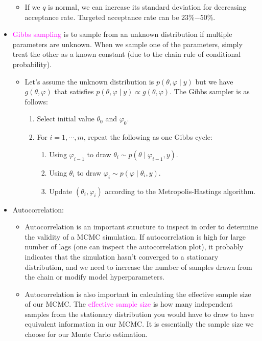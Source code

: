\documentclass[UTF8]{book}
\newcommand{\concept}[1]{\textcolor{magenta}{#1}}
\begin{document}
\begin{itemize}
\begin{itemize}
\begin{itemize}
	\end{itemize}
	\item If we $q$ is normal, we can increase its standard deviation for decreasing acceptance rate. Targeted acceptance rate can be 23\%$-50\%$.
\end{itemize}
\item \concept{Gibbs sampling} is to sample from an unknown distribution if multiple parameters are unknown. When we sample one of the parameters, simply treat the other as a known constant (due to the chain rule of conditional probability).
\begin{itemize}
	\item Let's assume the unknown distribution is $p(\theta,\varphi\mid y)$ but we have $g(\theta,\varphi)$ that satisfies $p(\theta,\varphi\mid y)\propto g(\theta,\varphi)$. The Gibbs sampler is as follows:
\begin{enumerate}
	\item Select initial value $\theta_0$ and $\varphi_0$.
	\item For $i=1,\cdots,m$, repeat the following as one Gibbs cycle:
	\begin{enumerate}
		\item Using $\varphi_{i-1}$ to draw $\theta_i\sim p(\theta\mid\varphi_{i-1}, y)$.
		\item Using $\theta_{i}$ to draw $\varphi_i\sim p(\varphi\mid\theta_{i}, y)$.
		\item Update $(\theta_i,\varphi_i)$ according to the Metropolis-Hastings algorithm.
	\end{enumerate}		
\end{enumerate}
\end{itemize}
\item Autocorrelation:
\begin{itemize}
	\item Autocorrelation is an important structure to inspect in order to determine the validity of a MCMC simulation. If autocorrelation is high for large number of lags (one can inspect the autocorrelation plot), it probably indicates that the simulation hasn't converged to a stationary distribution, and we need to increase the number of samples drawn from the chain or modify model hyperparameters.
	\item Autocorrelation is also important in calculating the effective sample size of our MCMC. The \concept{effective sample size} is how many independent samples from the stationary distribution you would have to draw to have equivalent information in our MCMC. It is essentially the sample size we choose for our Monte Carlo estimation.

\end{itemize}
\end{itemize}
\end{document}
